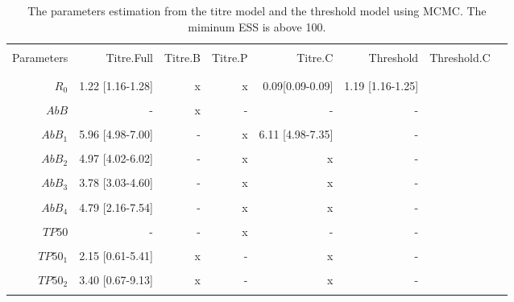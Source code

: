 \documentclass[12pt,a4paper]{article}
\begin{document}
\clearpage




\begin{table}[ht]
\begin{minipage}{\textwidth}     
\centering %
\caption{The parameters estimation from the titre model and the threshold model using MCMC. The miminum ESS is above 100.}
\centering %
\begin{tabular}{rrrrrrrr}

\hline\hline \\%
Parameters &       Titre.Full	 &  Titre.B & Titre.P & Titre.C & Threshold & Threshold.C\\ \\
\hline %
   \\
   $R_{0}$   &     1.22 [1.16-1.28] &    x & 	x	&  0.09[0.09-0.09]  & 1.19 [1.16-1.25]\\ \\

   $AbB$ 	 &     -	 			& 	 x &	- 	&- &-\\ \\
      
   $AbB_{1}$ &     5.96 [4.98-7.00] &  	 - & 	x	& 6.11 [4.98-7.35] &-\\ \\

   $AbB_{2}$ &     4.97 [4.02-6.02] &    - &	x	&x &-\\ \\

   $AbB_{3}$ &     3.78 [3.03-4.60] &    - &	x	&x &-\\ \\

   $AbB_{4}$ &     4.79 [2.16-7.54] &    - &	x	&x &-\\ \\
   
   $\mathit{TP50}$ &    -   		&    - &	x 	&- &-\\ \\
      
   $\mathit{TP50_{1}}$ & 2.15 [0.61-5.41] &  x &-	&x &-\\ \\

   $\mathit{TP50_{2}}$ & 3.40 [0.67-9.13] &  x &- 	&x &-\\ \\


\end{tabular}
\end{minipage}
\end{table}
\end{document}
